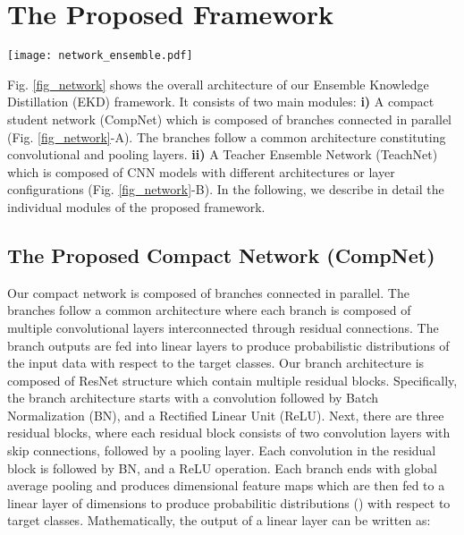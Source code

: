 \documentclass{ecai}
\begin{document}
\section{The Proposed Framework}\label{proposed_framework}
\begin{figure*}[t!]
  \begin{center}
    \texttt{[image: network\_ensemble.pdf]}
  \vspace{-10pt}
  \caption{Overview of our framework which consists of a Compact Network (CompNet)-A and a teacher ensemble network (TeachNet)-B. CompNet is composed of parallel branches with similar architecture topology. During training, the branches are coupled with the sub-networks of the teacher ensemble and the parameters of the CompNet model are optimized with respect to the ground truth labels as well as the high-level features produced by the teacher ensemble. During testing, the branches of CompNet are executed in parallel (to increase inference speed) and their outputs are summed before Softmax to produce final predictions.} 
  \vspace{-5pt}
  \label{fig_network}
  \end{center}
\end{figure*}
Fig. \ref{fig_network} shows the overall architecture of our Ensemble Knowledge Distillation (EKD) framework. It consists of two main modules: \textbf{i)} A compact student network (CompNet) which is composed of  branches connected in parallel (Fig. \ref{fig_network}-A). The branches follow a common architecture constituting convolutional and pooling layers. \textbf{ii)} A Teacher Ensemble Network (TeachNet) which is composed of  CNN models with different architectures or layer configurations (Fig. \ref{fig_network}-B). In the following, we describe in detail the individual modules of the proposed framework.
\subsection{The Proposed Compact Network (CompNet)}\label{student_network}
Our compact network is composed of  branches connected in parallel. The branches follow a common architecture where each branch is composed of multiple convolutional layers interconnected through residual connections. The branch outputs are fed into linear layers  to produce probabilistic distributions of the input data with respect to the target classes.
Our branch architecture is composed of ResNet structure which contain multiple residual blocks.
Specifically, the branch architecture starts with a  convolution followed by Batch Normalization (BN), and a Rectified Linear Unit (ReLU). Next, there are three residual blocks, where each residual block consists of two convolution layers with skip connections, followed by a pooling layer. Each convolution in the residual block is followed by BN, and a ReLU operation.
Each branch ends with global average pooling and produces dimensional feature maps which are then fed to a linear layer of  dimensions to produce probabilitic distributions () with respect to  target classes. Mathematically, the output of a linear layer can be written as:
\end{document}
